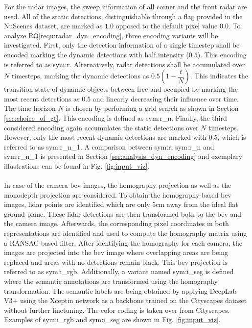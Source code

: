 For the radar images, the sweep information of all corner and the front radar are used. All of the static detections, distinguishable through a flag provided in the NuScenes dataset, are marked as $1.0$ opposed to the default pixel value $0.0$. To analyze RQ\ref{requ:radar_dyn_encoding}, three encoding variants will be investigated. First, only the detection information of a single timestep shall be encoded marking the dynamic detections with half intensity ($0.5$). This encoding is referred to as \gls{sym:r}. Alternatively, radar detections shall be accumulated over $N$ timesteps, marking the dynamic detections as $0.5(1-\dfrac{t}{N})$. This indicates the transition state of dynamic objects between free and occupied by marking the most recent detections as $0.5$ and linearly decreasing their influence over time. The time horizon $N$ is chosen by performing a grid search as shown in Section \ref{sec:choice_of_gt}. This encoding is defined as \gls{sym:r_n}. Finally, the third considered encoding again accumulates the static detections over $N$ timesteps. However, only the most recent dynamic detections are marked with $0.5$, which is referred to as \gls{sym:r_n_1}. A comparison between \gls{sym:r}, \gls{sym:r_n} and \gls{sym:r_n_1} is presented in Section \ref{sec:analysis_dyn_encoding} and exemplary illustrations can be found in Fig. \ref{fig:input_viz}.
\\\\
In case of the camera \gls{bev} images, the homography projection as well as the \gls{monodepth} projection are considered. To obtain the homography-based \gls{bev} images, lidar points are identified which are only $5$cm away from the ideal flat ground-plane. These lidar detections are then transformed both to the \gls{bev} and the camera image. Afterwards, the corresponding pixel coordinates in both representations are identified and used to compute the homography matrix using a RANSAC-based filter. After identifying the homography for each camera, the images are projected into the \gls{bev} image where overlapping areas are being replaced and areas with no detections remain black. This \gls{bev} projection is referred to as \gls{sym:i_rgb}. Additionally, a variant named \gls{sym:i_seg} is defined where the semantic annotations are transformed using the homography transformation. The semantic labels are being obtained by applying DeepLab V3+ \cite{deeplabv3plus2018} using the Xceptin network \cite{chollet2017xception} as a backbone trained on the Cityscapes dataset \cite{cordts2016cityscapes} without further finetuning. The color coding is taken over from Cityscapes. Examples of \gls{sym:i_rgb} and \gls{sym:i_seg} are shown in Fig. \ref{fig:input_viz}. 
